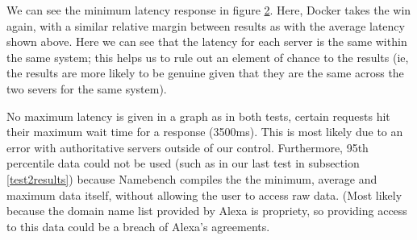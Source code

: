 \begin{figure}[H]
\caption{}
\label{fig:test3graphaverage}
\centering
\end{figure}

We can see the minimum latency response in figure \ref{fig:test3graphmin}. Here, Docker takes the win again, with a similar relative margin between results as with the average latency shown above. Here we can see that the latency for each server is the same within the same system; this helps us to rule out an element of chance to the results (ie, the results are more likely to be genuine given that they are the same across the two severs for the same system).

\begin{figure}[H]
\caption{}
\label{fig:test3graphmin}
\centering
\end{figure}

No maximum latency is given in a graph as in both tests, certain requests hit their maximum wait time for a response (3500ms). This is most likely due to an error with authoritative servers outside of our control. Furthermore, 95th percentile data could not be used (such as in our last test in subsection \ref{test2results}) because Namebench compiles the the minimum, average and maximum data itself, without allowing the user to access raw data. (Most likely because the domain name list provided by Alexa \citep{alexainternet} is propriety, so providing access to this data could be a breach of Alexa's agreements.

